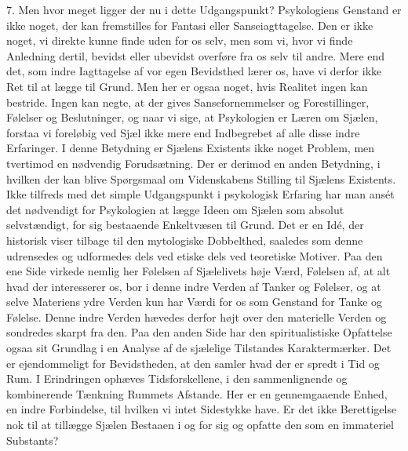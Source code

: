 \documentclass[12pt,a4paper,openany]{book}
\newcommand{\opage}[1]{\marginnote{\footnotesize\textit{[#1]}}}
\begin{document}
7. Men hvor meget ligger der nu i dette Udgangspunkt? Psykologiens
Genstand er ikke noget, der kan fremstilles for Fantasi eller
Sanseiagttagelse. Den er ikke noget, vi direkte kunne finde uden for os
selv, men som vi, hvor vi finde Anledning dertil, bevidst eller ubevidst
overføre fra os selv til andre. Mere end det, som indre Iagttagelse af
vor egen Bevidsthed lærer os, have vi derfor ikke Ret til at lægge til
Grund. Men her er ogsaa noget, hvis Realitet ingen kan
\opage{14}bestride. Ingen kan negte, at der gives Sansefornemmelser og
Forestillinger, Følelser og Beslutninger, og naar vi sige, at
Psykologien er Læren om Sjælen, forstaa vi foreløbig ved Sjæl ikke mere
end Indbegrebet af alle disse indre Erfaringer. I denne Betydning er
Sjælens Existents ikke noget Problem, men tvertimod en nødvendig
Forudsætning. Der er derimod en anden Betydning, i hvilken der kan blive
Spørgsmaal om Videnskabens Stilling til Sjælens Existents. Ikke tilfreds
med det simple Udgangspunkt i psykologisk Erfaring har man ansét det
nødvendigt for Psykologien at lægge Ideen om Sjælen som absolut
selvstændigt, for sig bestaaende Enkeltvæsen til Grund. Det er en Idé,
der historisk viser tilbage til den mytologiske Dobbelthed, saaledes som
denne udrensedes og udformedes dels ved etiske dels ved teoretiske
Motiver. Paa den ene Side virkede nemlig her Følelsen af Sjælelivets
høje Værd, Følelsen af, at alt hvad der interesserer os, bor i denne
indre Verden af Tanker og Følelser, og at selve Materiens ydre Verden
kun har Værdi for os som Genstand for Tanke og Følelse. Denne indre
Verden hævedes derfor højt over den materielle Verden og sondredes
skarpt fra den. Paa den anden Side har den spiritualistiske Opfattelse
ogsaa sit Grundlag i en Analyse af de sjælelige Tilstandes
Karaktermærker. Det er ejendommeligt for Bevidstheden, at den samler
hvad der er spredt i Tid og Rum. I Erindringen ophæves Tidsforskellene,
i den sammenlignende og kombinerende Tænkning Rummets Afstande. Her er
en gennemgaaende Enhed, en indre Forbindelse, til hvilken vi intet
Sidestykke have. Er det ikke Berettigelse nok til at tillægge Sjælen
Bestaaen i og for sig og opfatte den som en immateriel Substants?
\end{document}
